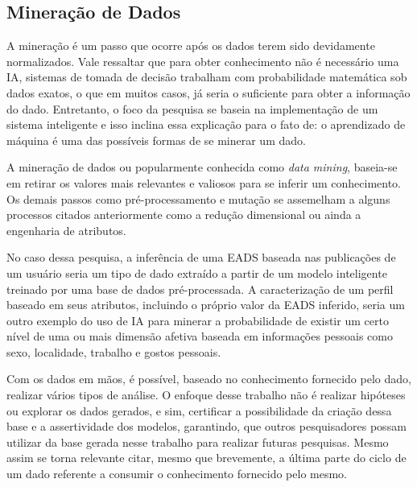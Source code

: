 \subsection{Mineração de Dados}
A mineração é um passo que ocorre após os dados terem sido devidamente normalizados. Vale ressaltar que para obter conhecimento não é necessário uma IA, sistemas de tomada de decisão trabalham com probabilidade matemática sob dados exatos, o que em muitos casos, já seria o suficiente para obter a informação do dado. Entretanto, o foco da pesquisa se baseia na implementação de um sistema inteligente e isso inclina essa explicação para o fato de: o aprendizado de máquina é uma das possíveis formas de se minerar um dado.

A mineração de dados ou popularmente conhecida como \textit{data mining}, baseia-se em retirar os valores mais relevantes e valiosos para se inferir um conhecimento. Os demais passos como pré-processamento e mutação se assemelham a alguns processos citados anteriormente como a redução dimensional ou ainda a engenharia de atributos.

No caso dessa pesquisa, a inferência de uma EADS baseada nas publicações de um usuário seria um tipo de dado extraído a partir de um modelo inteligente treinado por uma base de dados pré-processada. A caracterização de um perfil baseado em seus atributos, incluindo o próprio valor da EADS inferido, seria um outro exemplo do uso de IA para minerar a probabilidade de existir um certo nível de uma ou mais dimensão afetiva baseada em informações pessoais como sexo, localidade, trabalho e gostos pessoais.

Com os dados em mãos, é possível, baseado no conhecimento fornecido pelo dado, realizar vários tipos de análise. O enfoque desse trabalho não é realizar hipóteses ou explorar os dados gerados, e sim, certificar a possibilidade da criação dessa base e a assertividade dos modelos, garantindo, que outros pesquisadores possam utilizar da base gerada nesse trabalho para realizar futuras pesquisas. Mesmo assim se torna relevante citar, mesmo que brevemente, a última parte do ciclo de um dado referente a consumir o conhecimento fornecido pelo mesmo.
